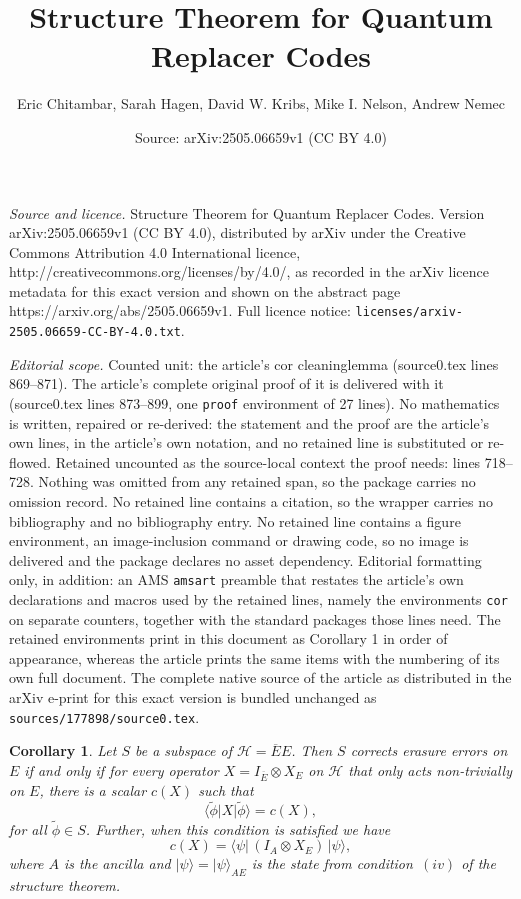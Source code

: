 \documentclass[10pt,a4paper]{amsart}
\title{Structure Theorem for Quantum Replacer Codes}
\author{Eric Chitambar, Sarah Hagen, David W. Kribs, Mike I. Nelson, Andrew Nemec}
\date{Source: arXiv:2505.06659v1 (CC BY 4.0)}
\newtheorem{cor}{Corollary}
\def\bra#1{\langle #1 |}
\def\ket#1{| #1 \rangle}
\begin{document}
\maketitle

\noindent\emph{Source and licence.} Structure Theorem for Quantum Replacer Codes. Version arXiv:2505.06659v1 (CC BY 4.0), distributed by arXiv under the Creative Commons Attribution 4.0 International licence, http://creativecommons.org/licenses/by/4.0/, as recorded in the arXiv licence metadata for this exact version and shown on the abstract page https://arxiv.org/abs/2505.06659v1. Full licence notice: \texttt{licenses/arxiv-2505.06659-CC-BY-4.0.txt}.\par\smallskip

\noindent\textit{Editorial scope.} Counted unit: the article's cor cleaninglemma (source0.tex lines 869--871). The article's complete original proof of it is delivered with it (source0.tex lines 873--899, one \texttt{proof} environment of 27 lines). No mathematics is written, repaired or re-derived: the statement and the proof are the article's own lines, in the article's own notation, and no retained line is substituted or re-flowed.  Retained uncounted as the source-local context the proof needs: lines 718--728.  Nothing was omitted from any retained span, so the package carries no omission record.  No retained line contains a citation, so the wrapper carries no bibliography and no bibliography entry.  No retained line contains a figure environment, an image-inclusion command or drawing code, so no image is delivered and the package declares no asset dependency.  Editorial formatting only, in addition: an AMS \texttt{amsart} preamble that restates the article's own declarations and macros used by the retained lines, namely the environments \texttt{cor} on separate counters, together with the standard packages those lines need.  The retained environments print in this document as Corollary 1 in order of appearance, whereas the article prints the same items with the numbering of its own full document.  The complete native source of the article as distributed in the arXiv e-print for this exact version is bundled unchanged as \texttt{sources/177898/source0.tex}.
\begin{cor}\label{correctablecor}
    Let $S$ be a subspace of $\mathcal H = \overline{E} E$. Then $S$ corrects erasure errors on $E$ if and only if for every operator $X = I_{\overline{E}} \otimes X_E$ on $\mathcal H$ that only acts non-trivially on $E$, there is a scalar $c(X)$ such that 
    \[
    \bra{\widetilde{\phi}} X \ket{\widetilde{\phi}} = c(X), 
    \]
    for all $\widetilde{\phi}\in S$. Further, when this condition is satisfied we have 
    \[
    c(X) =  \bra{\psi} \, (I_A \otimes X_E) \,   \ket{\psi} , 
    \]
    where $A$ is the ancilla and $\ket{\psi} = \ket{\psi}_{AE}$ is the state from condition~$(iv)$ of the structure theorem. 
\end{cor}
\end{document}
